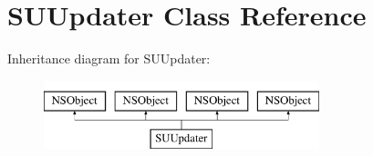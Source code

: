 \hypertarget{interface_s_u_updater}{}\section{S\+U\+Updater Class Reference}
\label{interface_s_u_updater}
Inheritance diagram for S\+U\+Updater\+:\begin{figure}[H]
\begin{center}
\leavevmode
\includegraphics[height=2.000000cm]{interface_s_u_updater}
\end{center}
\end{figure}

